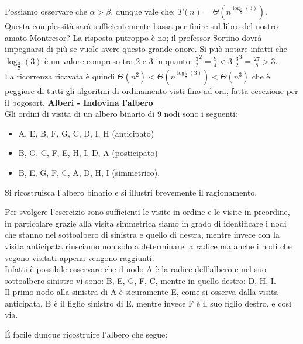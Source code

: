 \documentclass[../cheatSheetAlgoritmi.tex]{subfiles}
\begin{document}
Possiamo osservare che $\alpha > \beta$, dunque vale che: $T(n) = \Theta(n^{\log_{\frac{3}{2}}(3)})$. \\ Questa complessità sarà sufficientemente bassa per finire sul libro del nostro amato Montresor? La risposta putroppo è no; il professor Sortino dovrà impegnarsi di più se vuole avere questo grande onore. Si può notare infatti che $\log_{\frac{3}{2}}(3)$ è un valore compreso tra 2 e 3 in quanto: $\frac{3}{2}^2 = \frac{9}{4} < 3$ $\frac{3}{2}^3 = \frac{27}{8} >3 $. \\ La ricorrenza ricavata è quindi $\Theta(n^2) < \Theta(n^{\log_{\frac{3}{2}}(3)}) < \Theta(n^3)$ che è peggiore di tutti gli algoritmi di ordinamento visti fino ad ora, fatta eccezione per il bogosort.
\newpage
\textbf{Alberi - Indovina l'albero}\\
Gli ordini di visita di un albero binario di 9 nodi sono i seguenti:

\begin{itemize}
	\item A, E, B, F, G, C, D, I, H (anticipato)
	\item B, G, C, F, E, H, I, D, A (posticipato)
	\item B, E, G, F, C, A, D, H, I (simmetrico).
\end{itemize}

Si ricostruisca l’albero binario e si illustri brevemente il ragionamento.

\bigskip
Per svolgere l'esercizio sono sufficienti le visite in ordine e le visite in preordine, in particolare grazie alla visita simmetrica siamo in grado di identificare i nodi che stanno nel sottoalbero di sinistra e quello di destra, mentre invece con la visita anticipata riusciamo non solo a determinare la radice ma anche i nodi che vegono visitati appena vengono raggiunti.\\
Infatti è possibile osservare che il nodo A è la radice dell'albero e nel suo sottoalbero sinistro vi sono: B, E, G, F, C, mentre in quello destro: D, H, I. \\
Il primo nodo alla sinistra di A è sicuramente E, come si osserva dalla visita anticipata. B è il figlio sinistro di E, mentre invece F è il suo figlio destro, e così via.

É facile dunque ricostruire l'albero che segue:

\begin{center}
\end{center}
\end{document}
